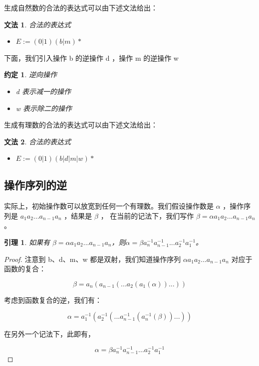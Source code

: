 \documentclass[a4paper,12pt]{article}
\newtheorem{lemma}{引理}
\newtheorem{grammar}{文法}
\newtheorem{convention}{约定}
\begin{document}
生成自然数的合法的表达式可以由下述文法给出：

\begin{grammar}
\label{g1}
合法的表达式
\begin{itemize}
\item $E := (0 | 1)(b | m)*$
\end{itemize}
\end{grammar}

下面，我们引入操作 b 的逆操作 d ，操作 m 的逆操作 w

\begin{convention}
逆向操作
\begin{itemize}
\item d 表示减一的操作
\item w 表示除二的操作
\end{itemize}
\end{convention}

生成有理数的合法的表达式可以由下述文法给出：

\begin{grammar}
\label{g2}
合法的表达式
\begin{itemize}
\item $E := (0 | 1)(b | d | m | w)*$
\end{itemize}
\end{grammar}


\subsection{操作序列的逆}

实际上，初始操作数可以放宽到任何一个有理数。我们假设操作数是 $\alpha$ ，操作序列是 $a_1 a_2 ... a_{n-1} a_n$ ，结果是 $\beta$ ，
在当前的记法下，我们写作 $\beta = \alpha a_1 a_2 ... a_{n-1} a_n$。

\begin{lemma}
\label{l1}
如果有 $\beta = \alpha a_1 a_2 ... a_{n-1} a_n$，则$\alpha = \beta a_n^{-1} a_{n-1}^{-1} ... a_2^{-1} a_1^{-1}$。
\end{lemma}

\begin{proof}
注意到 b、d、m、w 都是双射，我们知道操作序列 $\alpha a_1 a_2 ... a_{n-1} a_n$ 对应于函数的复合：

$$\beta = a_n( a_{n-1}( ... a_2( a_1(\alpha) ) ... ) )$$

考虑到函数复合的逆，我们有：

$$\alpha = a_1^{-1}( a_2^{-1}( ... a_{n-1}^{-1}( a_n^{-1}(\beta) ) ... ) )$$

在另外一个记法下，此即有，

$$\alpha = \beta a_n^{-1} a_{n-1}^{-1} ... a_2^{-1} a_1^{-1}$$

\qedhere

\end{proof}
\end{document}
